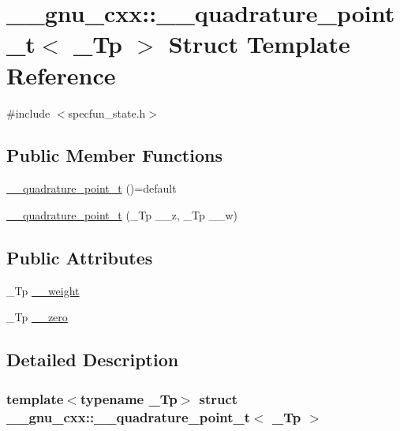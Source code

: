 \hypertarget{struct____gnu__cxx_1_1____quadrature__point__t}{}\section{\+\_\+\+\_\+gnu\+\_\+cxx\+:\+:\+\_\+\+\_\+quadrature\+\_\+point\+\_\+t$<$ \+\_\+\+Tp $>$ Struct Template Reference}
\label{struct____gnu__cxx_1_1____quadrature__point__t}


{\ttfamily \#include $<$specfun\+\_\+state.\+h$>$}

\subsection*{Public Member Functions}
\begin{DoxyCompactItemize}
\item 
\hyperlink{struct____gnu__cxx_1_1____quadrature__point__t_a77da59f678e286f58b484a4a1660ae32}{\+\_\+\+\_\+quadrature\+\_\+point\+\_\+t} ()=default
\item 
\hyperlink{struct____gnu__cxx_1_1____quadrature__point__t_a91907b974470c831d6e446987d5f60cb}{\+\_\+\+\_\+quadrature\+\_\+point\+\_\+t} (\+\_\+\+Tp \+\_\+\+\_\+z, \+\_\+\+Tp \+\_\+\+\_\+w)
\end{DoxyCompactItemize}
\subsection*{Public Attributes}
\begin{DoxyCompactItemize}
\item 
\+\_\+\+Tp \hyperlink{struct____gnu__cxx_1_1____quadrature__point__t_a231e04e186e8e45b431876cc958a81c2}{\+\_\+\+\_\+weight}
\item 
\+\_\+\+Tp \hyperlink{struct____gnu__cxx_1_1____quadrature__point__t_a9fe76d952db0e4c8a10f81da8c811719}{\+\_\+\+\_\+zero}
\end{DoxyCompactItemize}


\subsection{Detailed Description}
\subsubsection*{template$<$typename \+\_\+\+Tp$>$\newline
struct \+\_\+\+\_\+gnu\+\_\+cxx\+::\+\_\+\+\_\+quadrature\+\_\+point\+\_\+t$<$ \+\_\+\+Tp $>$}

